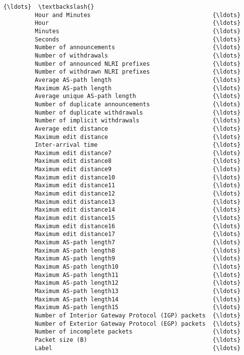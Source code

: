 \documentclass[11pt]{article}
\begin{document}
\begin{Verbatim}[commandchars=\\\{\}]
                                                            {\ldots}  \textbackslash{}
         Hour and Minutes                                   {\ldots}   
         Hour                                               {\ldots}   
         Minutes                                            {\ldots}   
         Seconds                                            {\ldots}   
         Number of announcements                            {\ldots}   
         Number of withdrawals                              {\ldots}   
         Number of announced NLRI prefixes                  {\ldots}   
         Number of withdrawn NLRI prefixes                  {\ldots}   
         Average AS-path length                             {\ldots}   
         Maximum AS-path length                             {\ldots}   
         Average unique AS-path length                      {\ldots}   
         Number of duplicate announcements                  {\ldots}   
         Number of duplicate withdrawals                    {\ldots}   
         Number of implicit withdrawals                     {\ldots}   
         Average edit distance                              {\ldots}   
         Maximum edit distance                              {\ldots}   
         Inter-arrival time                                 {\ldots}   
         Maximum edit distance7                             {\ldots}   
         Maximum edit distance8                             {\ldots}   
         Maximum edit distance9                             {\ldots}   
         Maximum edit distance10                            {\ldots}   
         Maximum edit distance11                            {\ldots}   
         Maximum edit distance12                            {\ldots}   
         Maximum edit distance13                            {\ldots}   
         Maximum edit distance14                            {\ldots}   
         Maximum edit distance15                            {\ldots}   
         Maximum edit distance16                            {\ldots}   
         Maximum edit distance17                            {\ldots}   
         Maximum AS-path length7                            {\ldots}   
         Maximum AS-path length8                            {\ldots}   
         Maximum AS-path length9                            {\ldots}   
         Maximum AS-path length10                           {\ldots}   
         Maximum AS-path length11                           {\ldots}   
         Maximum AS-path length12                           {\ldots}   
         Maximum AS-path length13                           {\ldots}   
         Maximum AS-path length14                           {\ldots}   
         Maximum AS-path length15                           {\ldots}   
         Number of Interior Gateway Protocol (IGP) packets  {\ldots}   
         Number of Exterior Gateway Protocol (EGP) packets  {\ldots}   
         Number of incomplete packets                       {\ldots}   
         Packet size (B)                                    {\ldots}   
         Label                                              {\ldots}   
         

\end{Verbatim}
\end{document}
